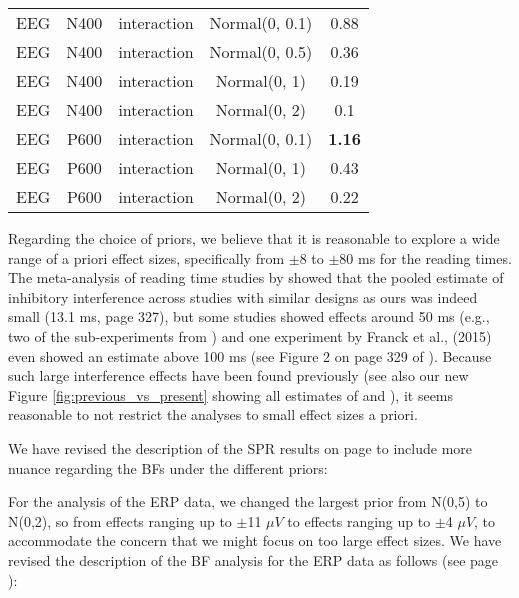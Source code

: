 \documentclass[12pt]{article}
\begin{document}
\begin{table}[h]
\begin{tabular}{ccccc}
EEG & N400 &interaction &Normal(0, 0.1)&0.88\\
EEG & N400 &interaction &Normal(0, 0.5)&0.36\\
EEG & N400 &interaction  & Normal(0, 1)&0.19\\
EEG & N400 &interaction  & Normal(0, 2) & 0.1\\
EEG & P600 &interaction &Normal(0, 0.1)& \textbf{1.16}\\
EEG & P600 &interaction &  Normal(0, 1) &0.43\\
EEG & P600 &interaction &  Normal(0, 2) &0.22\\
\bottomrule
\end{tabular}

\end{table}

Regarding the choice of priors, we believe that it is reasonable to explore a wide range of a priori effect sizes, specifically from $\pm$8 to $\pm$80 ms for the reading times. The meta-analysis of reading time studies by \textcite{jaeger_etal_2017} showed that the pooled estimate of inhibitory interference across studies with similar designs as ours was indeed small (13.1 ms, page 327), but some studies showed effects around 50 ms (e.g., two of the sub-experiments from \cite{vandyke07}) and one experiment by Franck et al., (2015) even showed an estimate above 100 ms (see Figure 2 on page 329 of \cite{jaeger_etal_2017}). Because such large interference effects have been found previously (see also our new Figure \ref{fig:previous_vs_present} showing all estimates of \cite{vandyke07} and \cite{mertzen}), it seems reasonable to not restrict the analyses to small effect sizes a priori.

We have revised the description of the SPR results on page \pageref{SPR_results} to include more nuance regarding the BFs under the different priors:

\setcounter{figure}{4}
\begin{quote}
\end{quote}

For the analysis of the ERP data, we changed the largest prior from N(0,5) to N(0,2), so from effects ranging up to $\pm$11 $\mu V$ to effects ranging up to $\pm$4 $\mu V$, to accommodate the concern that we might focus on too large effect sizes. We have revised the description of the BF analysis for the ERP data as follows (see page \pageref{ERP_results3}):

\begin{quote}
\end{quote}
\end{document}

